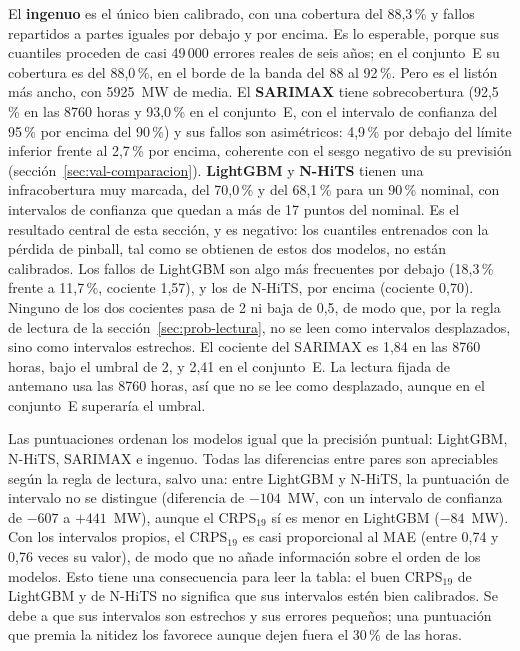 El \textbf{ingenuo} es el único bien calibrado, con una cobertura del 88,3\,\%
y fallos repartidos a partes iguales por debajo y por encima. Es lo esperable,
porque sus cuantiles proceden de casi 49\,000 errores reales de seis años; en el
conjunto~E su cobertura es del 88,0\,\%, en el borde de la banda del 88 al
92\,\%. Pero es el listón más ancho, con 5925~MW de media. El \textbf{SARIMAX}
tiene sobrecobertura (92,5\,\% en las 8760 horas y 93,0\,\% en el
conjunto~E, con el intervalo de confianza del 95\,\% por encima del 90\,\%) y
sus fallos son asimétricos: 4,9\,\% por debajo del límite inferior frente al
2,7\,\% por encima, coherente con el sesgo negativo de su previsión
(sección~\ref{sec:val-comparacion}). \textbf{LightGBM} y \textbf{N-HiTS} tienen
una infracobertura muy marcada, del 70,0\,\% y del 68,1\,\% para un 90\,\%
nominal, con intervalos de confianza que quedan a más de 17 puntos del
nominal. Es el resultado central de esta sección, y es negativo: los cuantiles
entrenados con la pérdida de pinball, tal como se obtienen de estos dos modelos,
no están calibrados. Los fallos de LightGBM son algo más frecuentes por debajo
(18,3\,\% frente a 11,7\,\%, cociente 1,57), y los de N-HiTS, por encima
(cociente 0,70). Ninguno de los dos cocientes pasa de 2 ni baja de 0,5, de modo
que, por la regla de lectura de la sección~\ref{sec:prob-lectura}, no se leen
como intervalos desplazados, sino como intervalos estrechos. El cociente del
SARIMAX es 1,84 en las 8760 horas, bajo el umbral de 2, y 2,41 en el
conjunto~E. La lectura fijada de antemano usa las 8760 horas, así que no se
lee como desplazado, aunque en el conjunto~E superaría el umbral.

Las puntuaciones ordenan los modelos igual que la precisión puntual: LightGBM,
N-HiTS, SARIMAX e ingenuo. Todas las diferencias entre pares son apreciables
según la regla de lectura, salvo una: entre LightGBM y N-HiTS, la puntuación de
intervalo no se distingue (diferencia de $-104$~MW, con un intervalo de
confianza de $-607$ a $+441$~MW), aunque el CRPS$_{19}$ sí es menor en
LightGBM ($-84$~MW). Con los intervalos propios, el CRPS$_{19}$ es casi
proporcional al MAE (entre 0,74 y 0,76 veces su valor), de modo que no añade
información sobre el orden de los modelos. Esto tiene una consecuencia para
leer la tabla: el buen CRPS$_{19}$ de LightGBM y de N-HiTS no significa que sus
intervalos estén bien calibrados. Se debe a que sus intervalos son estrechos y
sus errores pequeños; una puntuación que premia la nitidez los favorece aunque
dejen fuera el 30\,\% de las horas.

